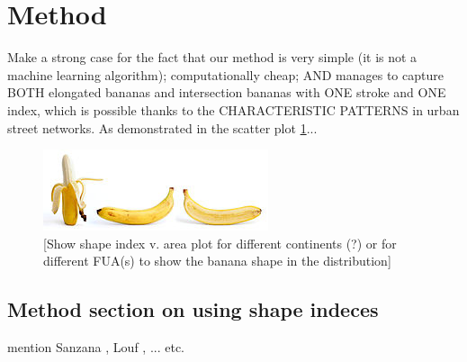 \section{Method}
\label{sec:method}



Make a strong case for the fact that our method is very simple (it is not a machine
learning algorithm); computationally cheap; AND manages to capture BOTH elongated
bananas and intersection bananas with ONE stroke and ONE index, which is possible thanks
to the CHARACTERISTIC PATTERNS in urban street networks. As demonstrated in the scatter
plot \ref{fig:banana-scatter}...

\begin{figure}
    \centering
    \includegraphics{figures/banana}
    \caption{[Show shape index v. area plot for different continents (?) or for
    different FUA(s) to show the banana shape in the distribution]}
    \label{fig:banana-scatter}
\end{figure}

\subsection*{Method section on using shape indeces}
mention Sanzana \cite{sanzana_decomposition_2018}, Louf \cite{louf_typology_2014}, ...
etc.


